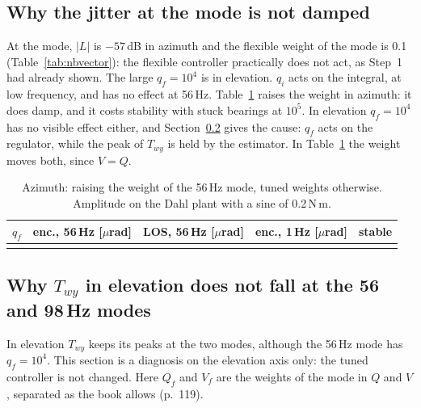 \documentclass[10pt,a4paper]{article}
\numberwithin{equation}{section}
\begin{document}
\subsection{Why the jitter at the mode is not damped}
At the mode, $|L|$ is $-57$\,dB in azimuth and the flexible weight of the mode is 0.1 (Table~\ref{tab:nbvector}): the flexible controller practically does not act, as Step~1 had already shown. The large $q_f=10^4$ is in elevation. $q_i$ acts on the integral, at low frequency, and has no effect at 56\,Hz. Table~\ref{tab:qfaz} raises the weight in azimuth: it does damp, and it costs stability with stuck bearings at $10^5$. In elevation $q_f=10^4$ has no visible effect either, and Section~\ref{sec:twymodes} gives the cause: $q_f$ acts on the regulator, while the peak of $T_{wy}$ is held by the estimator. In Table~\ref{tab:qfaz} the weight moves both, since $V=Q$.

\begin{table}[H]\centering\footnotesize
\caption{Azimuth: raising the weight of the 56\,Hz mode, tuned weights otherwise. Amplitude on the Dahl plant with a sine of 0.2\,N\,m.}\label{tab:qfaz}
\begin{tabular}{lrrrc}\toprule
$q_f$ & enc., 56\,Hz [$\mu$rad] & LOS, 56\,Hz [$\mu$rad] & enc., 1\,Hz [$\mu$rad] & stable \\ \midrule
\\ \bottomrule
\end{tabular}\end{table}

\subsection{Why $T_{wy}$ in elevation does not fall at the 56 and 98\,Hz modes}\label{sec:twymodes}
In elevation $T_{wy}$ keeps its peaks at the two modes, although the 56\,Hz mode has $q_f=10^4$. This section is a diagnosis on the elevation axis only: the tuned controller is not changed. Here $Q_f$ and $V_f$ are the weights of the mode in $Q$ and $V$, separated as the book allows (p.~119).
\end{document}
